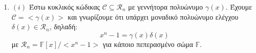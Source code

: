 \documentclass[oneside,a4paper]{article}
\newcommand{\C}{\mathcal{C}}
\begin{document}
\begin{enumerate}

	\item $(i)$ Έστω κυκλικός κώδικας $\C \subseteq \mathcal{R}_n $ με γεννήτορα πολυώνυμο $\gamma (x)$. Έχουμε $\C = < \gamma (x) >$ και γνωρίζουμε ότι υπάρχει μοναδικό πολυώνυμο ελέγχου $\delta (x) \in \mathcal{R}_n$, δηλαδή:
		$$x^n - 1 = \gamma (x) \delta (x)$$
		με $\mathcal{R}_n = \mathbb{F} [x] / < x^n -1 >$ για κάποιο πεπερασμένο σώμα $\mathbb{F}$.
		

\end{enumerate}
\end{document}
